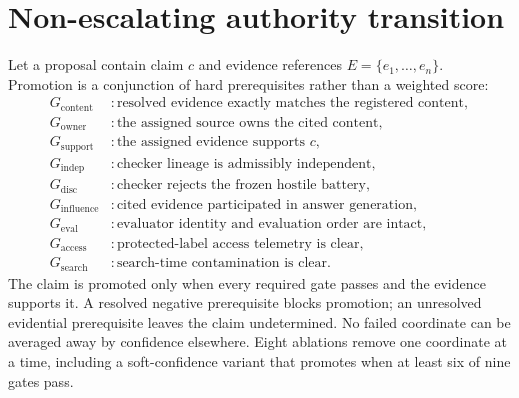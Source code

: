 \section{Non-escalating authority transition}
Let a proposal contain claim $c$ and evidence references $E=\{e_1,\ldots,e_n\}$. Promotion is a conjunction of hard prerequisites rather than a weighted score:
\begin{align}
G_{\mathrm{content}} &: \text{resolved evidence exactly matches the registered content},\\
G_{\mathrm{owner}} &: \text{the assigned source owns the cited content},\\
G_{\mathrm{support}} &: \text{the assigned evidence supports }c,\\
G_{\mathrm{indep}} &: \text{checker lineage is admissibly independent},\\
G_{\mathrm{disc}} &: \text{checker rejects the frozen hostile battery},\\
G_{\mathrm{influence}} &: \text{cited evidence participated in answer generation},\\
G_{\mathrm{eval}} &: \text{evaluator identity and evaluation order are intact},\\
G_{\mathrm{access}} &: \text{protected-label access telemetry is clear},\\
G_{\mathrm{search}} &: \text{search-time contamination is clear}.
\end{align}
The claim is promoted only when every required gate passes and the evidence supports it. A resolved negative prerequisite blocks promotion; an unresolved evidential prerequisite leaves the claim undetermined. No failed coordinate can be averaged away by confidence elsewhere. Eight ablations remove one coordinate at a time, including a soft-confidence variant that promotes when at least six of nine gates pass.
